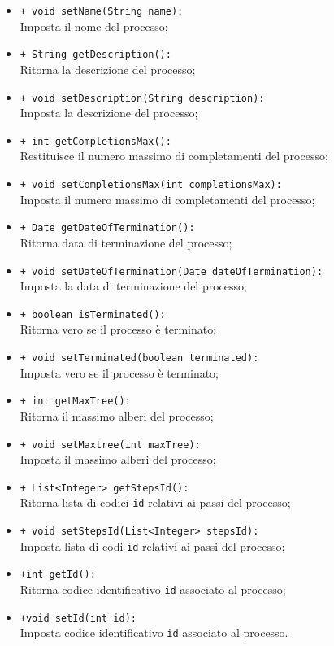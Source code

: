 \begin{flushleft}
\begin{itemize}
\begin{sloppypar}
\begin{itemize}
\item \texttt{+ void setName(String name):}\\ Imposta il nome del processo;
\item \texttt{+ String getDescription():}\\ Ritorna la descrizione del processo;
\item \texttt{+ void setDescription(String description):}\\ Imposta la descrizione del processo;
\item \texttt{+ int getCompletionsMax():}\\ Restituisce il numero massimo di completamenti del processo;
\item \texttt{+ void setCompletionsMax(int completionsMax):}\\ Imposta il numero massimo di completamenti del processo;
\item \texttt{+ Date getDateOfTermination():}\\ Ritorna data di terminazione del processo;
\item \texttt{+ void setDateOfTermination(Date dateOfTermination):}\\ Imposta la data di terminazione del processo;
\item \texttt{+ boolean isTerminated():}\\ Ritorna vero se il processo è terminato;
\item \texttt{+ void setTerminated(boolean terminated):}\\ Imposta vero se il processo è terminato;
\item \texttt{+ int getMaxTree():}\\ Ritorna il massimo alberi del processo;
\item \texttt{+ void setMaxtree(int maxTree):}\\ Imposta il massimo alberi del processo;
\item \texttt{+ List<Integer> getStepsId():}\\ Ritorna lista di codici \texttt{id} relativi ai passi del processo;
\item \texttt{+ void setStepsId(List<Integer> stepsId):}\\ Imposta lista di codi \texttt{id} relativi ai passi del processo;
\item \texttt{+int getId():}\\ Ritorna codice identificativo \texttt{id} associato al processo;
\item \texttt{+void setId(int id):}\\ Imposta codice identificativo \texttt{id} associato al processo.
\end{itemize}
\end{sloppypar}
\end{itemize}
\end{flushleft}

